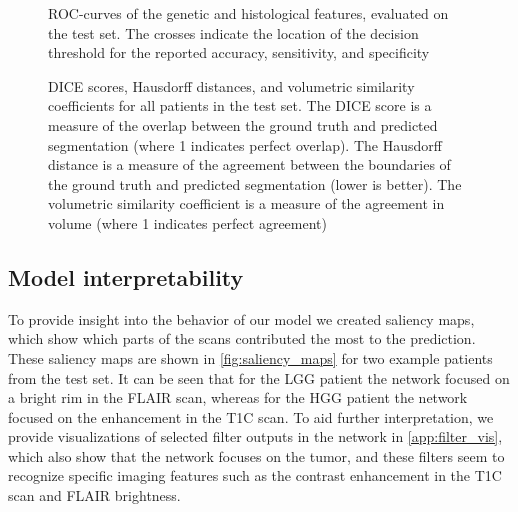 \begin{figure}[htbp]
\centering
{}
\caption{\Acrfull{ROC}-curves of the genetic and histological features, evaluated on the test set. The crosses indicate the location of the decision threshold for the reported accuracy, sensitivity, and specificity}\label{fig:roc_curves}
\end{figure}

\begin{figure}[htbp]
    \centering
    \caption{DICE scores, Hausdorff distances, and volumetric similarity coefficients for all patients in the test set.
    The DICE score is a measure of the overlap between the ground truth and predicted segmentation (where 1 indicates perfect overlap).
    The Hausdorff distance is a measure of the agreement between the boundaries of the ground truth and predicted segmentation (lower is better).
    The volumetric similarity coefficient is a measure of the agreement in volume (where 1 indicates perfect agreement)}\label{fig:segmentation_results}
\end{figure}

\subsection{Model interpretability}
To provide insight into the behavior of our model we created saliency maps, which show which parts of the scans contributed the most to the prediction.
These saliency maps are shown in \cref{fig:saliency_maps} for two example patients from the test set.
It can be seen that for the \gls{LGG} patient the network focused on a bright rim in the \gls{FLAIR} scan, whereas for the \gls{HGG} patient the network focused on the enhancement in the \gls{T1C} scan.
To aid further interpretation, we provide visualizations of selected filter outputs in the network in \cref{app:filter_vis}, which also show that the network focuses on the \gls{tumor}, and these filters seem to recognize specific imaging features such as the contrast enhancement in the \gls{T1C} scan and \gls{FLAIR} brightness.

